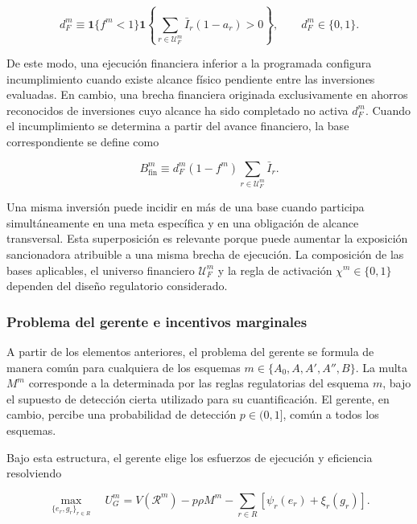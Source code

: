 \begin{equation}
\label{eq:incumplimiento_avance_financiero}
d_F^m
\equiv
\mathbf{1}\{f^m<1\}
\mathbf{1}
\left\{
\sum_{r\in\mathcal U_F^m}
\bar I_r(1-a_r)>0
\right\},
\qquad
d_F^m\in\{0,1\}.
\end{equation}

De este modo, una ejecución financiera inferior a la programada configura incumplimiento cuando existe alcance físico pendiente entre las inversiones evaluadas. En cambio, una brecha financiera originada exclusivamente en ahorros reconocidos de inversiones cuyo alcance ha sido completado no activa \(d_F^m\). Cuando el incumplimiento se determina a partir del avance financiero, la base correspondiente se define como

\begin{equation}
\label{eq:base_financiera}
B_{\mathrm{fin}}^m
\equiv
d_F^m
(1-f^m)
\sum_{r\in\mathcal U_F^m}
\bar I_r.
\end{equation}

Una misma inversión puede incidir en más de una base cuando participa simultáneamente en una meta específica y en una obligación de alcance transversal. Esta superposición es relevante porque puede aumentar la exposición sancionadora atribuible a una misma brecha de ejecución. La composición de las bases aplicables, el universo financiero \(\mathcal U_F^m\) y la regla de activación \(\chi^m\in\{0,1\}\) dependen del diseño regulatorio considerado.

\subsubsection{Problema del gerente e incentivos marginales}

A partir de los elementos anteriores, el problema del gerente se formula de manera común para cualquiera de los esquemas \(m\in\{A_0,A,A',A'',B\}\). La multa \(M^m\) corresponde a la determinada por las reglas regulatorias del esquema \(m\), bajo el supuesto de detección cierta utilizado para su cuantificación. El gerente, en cambio, percibe una probabilidad de detección \(p\in(0,1]\), común a todos los esquemas.

Bajo esta estructura, el gerente elige los esfuerzos de ejecución y eficiencia resolviendo

\begin{equation}
\label{eq:problema_gerente}
\max_{\{e_r,g_r\}_{r\in R}}
\quad
U_G^{m}
=
V\left(\mathcal R^{m}\right)
-
p\rho M^{m}
-
\sum_{r\in R}
\left[
\psi_r(e_r)
+
\xi_r(g_r)
\right].
\end{equation}

